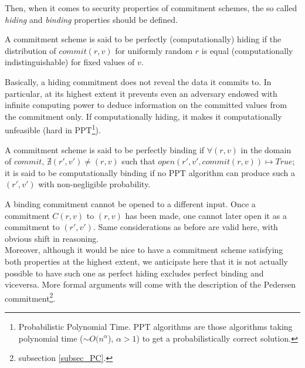 \noindent
Then, when it comes to security properties of commitment schemes, the so called \textit{hiding} and \textit{binding} properties should be defined.
\begin{mydef}
\label{hiding}
    A commitment scheme is said to be perfectly (computationally) hiding if the distribution of $commit(r,v)$ for uniformly random $r$ is equal (computationally indistinguishable) for fixed values of $v$.
\end{mydef}
\noindent
Basically, a hiding commitment does not reveal the data it commits to. In particular, at its highest extent it prevents even an adversary endowed with infinite computing power to deduce information on the committed values from the commitment only. If computationally hiding, it makes it computationally unfeasible (hard in PPT\footnote{Probabilistic Polynomial Time. PPT algorithms are those algorithms taking polynomial time ($\sim O(n^{\alpha}$), $\alpha > 1$) to get a probabilistically correct solution.}).
\begin{mydef}
\label{binding}
    A commitment scheme is said to be perfectly binding if $\forall (r,v)$ in the domain of $commit$, $\nexists (r',v')\neq(r,v)$ such that $open(r',v',commit(r,v)) \mapsto True$; it is said to be computationally binding if no PPT algorithm can produce such a $(r',v')$ with non-negligible probability.
\end{mydef}
\noindent
A binding commitment cannot be opened to a different input. Once a commitment $C(r,v)$ to $(r,v)$ has been made, one cannot later open it as a commitment to $(r',v')$. Same considerations as before are valid here, with obvious shift in reasoning. \\
Moreover, although it would be nice to have a commitment scheme satisfying both properties at the highest extent, we anticipate here that it is not actually possible to have such one as perfect hiding excludes perfect binding and viceversa. More formal arguments will come with the description of the Pedersen commitment\footnote{subsection \ref{subsec_PC}.}.

